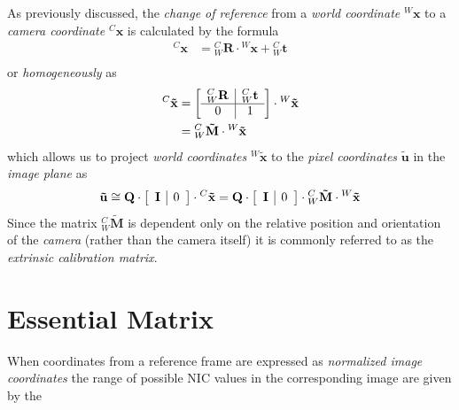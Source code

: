 \par As previously discussed, the \textit{change of reference} from a \textit{world coordinate} ${^W\mathbf{x}}$ to a \textit{camera coordinate} ${^C\mathbf{x}}$ is calculated by the formula
\begin{equation*}
\begin{split}
{^{C}\mathbf{x}}&={^{C}_{W}\mathbf{R}}\cdot{^{W}\mathbf{x}}+{^{C}_{W}\mathbf{t}}\\
\end{split}
\end{equation*}
or \textit{homogeneously} as
\begin{equation*}
\begin{split}
{^{C}\mathbf{\tilde{x}}}&=
\left[\begin{array}{c|c}{^{C}_{W}\mathbf{R}}&{^{C}_{W}\mathbf{t}}\\\hline 0 & 1 \end{array}\right]
\cdot{^{W}\mathbf{\tilde{x}}}\\
&={^C_W\mathbf{\tilde{M}}}\cdot{^W\mathbf{\tilde{x}}}
\end{split}
\end{equation*}
which allows us to project  \textit{world coordinates} ${^W\mathbf{\tilde{x}}}$ to the \textit{pixel coordinates} $\mathbf{\tilde{u}}$ in the \textit{image plane} as
\begin{equation*}
\begin{split}
\mathbf{\tilde{u}}\cong
\mathbf{Q}\cdot\left[\begin{array}{c|c}\mathbf{I} & 0\end{array}\right]\cdot{^C\mathbf{\tilde{x}}}=
\mathbf{Q}\cdot\left[\begin{array}{c|c}\mathbf{I} & 0\end{array}\right]\cdot{^C_W\mathbf{\tilde{M}}}\cdot{^W\mathbf{\tilde{x}}}
\end{split}
\end{equation*}  
Since the matrix ${^C_W\mathbf{\tilde{M}}}$ is dependent only on the relative position and orientation of the \textit{camera} (rather than the camera itself) it is commonly referred to as the \textit{extrinsic calibration matrix}.

\section{Essential Matrix}

\par When coordinates from a reference frame are expressed as \textit{normalized image coordinates} the range of possible NIC values in the corresponding image are given by the 


